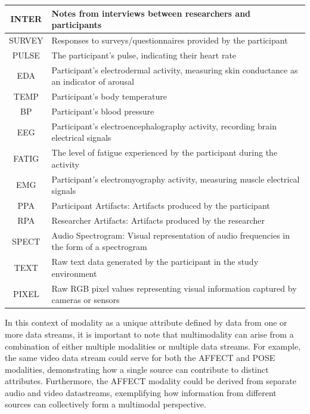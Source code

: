 \documentclass[manuscript,screen,review]{acmart}
\begin{document}
\begin{table}[ht]
\begin{tabular}{|c|p{}|}
    INTER & Notes from interviews between researchers and participants \\
    \hline
    SURVEY & Responses to surveys/questionnaires provided by the participant \\
    \hline
    PULSE & The participant's pulse, indicating their heart rate \\
    \hline
    EDA & Participant's electrodermal activity, measuring skin conductance as an indicator of arousal \\
    \hline
    TEMP & Participant’s body temperature \\
    \hline
    BP & Participant’s blood pressure \\
    \hline
    EEG & Participant's electroencephalography activity, recording brain electrical signals \\
    \hline
    FATIG & The level of fatigue experienced by the participant during the activity \\
    \hline
    EMG & Participant's electromyography activity, measuring muscle electrical signals \\
    \hline
    PPA & Participant Artifacts: Artifacts produced by the participant \\
    \hline
    RPA & Researcher Artifacts: Artifacts produced by the researcher \\
    \hline
    SPECT & Audio Spectrogram: Visual representation of audio frequencies in the form of a spectrogram \\
    \hline
    TEXT & Raw text data generated by the participant in the study environment \\
    \hline
    PIXEL & Raw RGB pixel values representing visual information captured by cameras or sensors \\
    \hline
  \end{tabular}
  \label{tab:modalities}
\end{table}

In this context of modality as a unique attribute defined by data from one or more data streams, it is important to note that multimodality can arise from a combination of either multiple modalities or multiple data streams. For example, the same video data stream could serve for both the AFFECT and POSE modalities, demonstrating how a single source can contribute to distinct attributes. Furthermore, the AFFECT modality could be derived from separate audio and video datastreams, exemplifying how information from different sources can collectively form a multimodal perspective.
\end{document}
